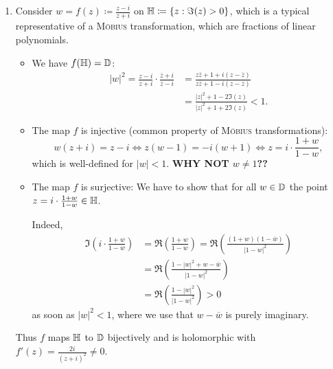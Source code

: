 \documentclass[a4paper,english]{article}
\begin{document}
\begin{exampleB}
\begin{enumerate}
        \item
        Consider $w = f(z) \coloneqq \frac{z - i}{z + i}$ on $\mathbb{H} \coloneqq \{ z: \Im(z) > 0\}$, which is a typical representative of a \textsc{Möbius} transformation, which are fractions of linear polynomials.
        
        \begin{itemize}
            \item 
            We have $f(\mathbb{H}) = \operatorname{\mathbb{D}}$:
            \begin{align*}
                | w |^2
                = \frac{z - i}{z + i} \cdot \frac{\overline{z} + i}{\overline{z} - i}
                & = \frac{z \bar{z} + 1 + i(z - \overline{z})}{z \bar{z} + 1 - i(z - \overline{z})} \\
                & = \frac{| z |^2 + 1 - 2 \Im(z)}{| z |^2 + 1 + 2 \Im(z)}
                < 1.
            \end{align*}
            
            \item
            The map $f$ is injective (common property of \textsc{Möbius} transformations):
            \begin{equation*}
                w (z + i)
                = z - i
                \iff z (w - 1) = - i (w + 1)
                \iff z = i \cdot \frac{1 + w}{1 - w},
            \end{equation*}
            which is well-defined for $| w | < 1$. \textbf{WHY NOT $w \ne 1$??}
            
            \item
            The map $f$ is surjective:
            We have to show that for all $w \in \operatorname{\mathbb{D}}$ the point $z = i \cdot \frac{1 + w}{1 - w} \in \mathbb{H}$.
            
            Indeed,
            \begin{align*}
                \Im\left(i \cdot \frac{1 + w}{1 - w}\right)
                & = \Re\left(\frac{1 + w}{1 - w}\right)
                = \Re\left(\frac{(1 + w)(1 - \overline{w})}{|1 - w|^2}\right) \\
                & = \Re\left(\frac{1 - | w |^2 + w - \overline{w}}{|1 - w|^2}\right) \\
                & = \Re\left(\frac{1 - | w |^2}{|1 - w|^2}\right)
                > 0
            \end{align*} 
            as soon as $| w |^2 < 1$, where we use that $w - \overline{w}$ is purely imaginary.
        \end{itemize}
        Thus $f$ maps $\mathbb{H}$ to $\operatorname{\mathbb{D}}$ bijectively and is holomorphic with $f'(z) = \frac{2 i}{(z + i)^2} \ne 0$.
        

\end{enumerate}
\end{exampleB}
\end{document}
